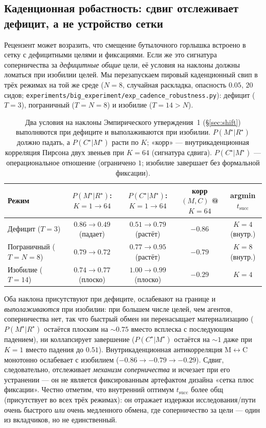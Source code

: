 \documentclass{article}
\newcommand{\method}[1]{\texttt{#1}}
\begin{document}
\subsection{Каденционная робастность: сдвиг отслеживает дефицит, а не устройство сетки}
\label{app:cadence-robustness}

Рецензент может возразить, что смещение бутылочного горлышка встроено в сетку с дефицитными
целями и фиксациями. Если же это сигнатура соперничества за \emph{дефицитные
общие} цели, её условия на наклоны должны ломаться при изобилии целей. Мы
перезапускаем пировый каденционный свип в трёх режимах на той же среде ($N{=}8$, случайная
раскладка, опасность $0.05$, $20$ сидов; \method{experiments/big\_experiment/exp\_cadence\_robustness.py}):
дефицит ($T{=}3$), пограничный ($T{=}N{=}8$) и изобилие ($T{=}14{>}N$).

\begin{table}[h]
\caption{Два условия на наклоны Эмпирического утверждения~1 (\S\ref{sec:shift}) выполняются при дефиците и выполаживаются при изобилии. $P(M^\star|R^\star)$ должно падать, а $P(C^\star|M^\star)$ расти по $K$; «корр» --- внутрикаденционная корреляция Пирсона двух звеньев при $K{=}64$ (сигнатура сдвига). $P(C^\star|M^\star)$ --- операциональное отношение (ограничено $1$; изобилие завершает без формальной фиксации).}
\label{tab:cadence-robustness}
\centering
\small
\begin{tabular}{l c c c c}
\toprule
Режим & $P(M^\star|R^\star)$: $K{=}1\!\to\!64$ & $P(C^\star|M^\star)$: $K{=}1\!\to\!64$ & корр$(M,C)$ @ $K{=}64$ & argmin $t_{\mathrm{succ}}$ \\
\midrule
Дефицит ($T{=}3$)      & $0.86 \to 0.49$ (падает) & $0.51 \to 0.79$ (растёт) & $-0.86$ & $K{=}4$ (внутр.) \\
Пограничный ($T{=}N{=}8$) & $0.79 \to 0.72$        & $0.77 \to 0.95$ (растёт) & $-0.79$ & $K{=}8$ (внутр.) \\
Изобилие ($T{=}14$)    & $0.74 \to 0.77$ (плоско)  & $1.00 \to 0.99$ (плоско)  & $-0.29$ & $K{=}4$ \\
\bottomrule
\end{tabular}
\end{table}

Оба наклона присутствуют при дефиците, ослабевают на границе и \emph{выполаживаются}
при изобилии: при большем числе целей, чем агентов, соперничества нет, так что быстрый
обмен ни перенасыщает материализацию ($P(M^\star|R^\star)$ остаётся плоским
на $\sim0.75$ вместо всплеска с последующим падением), ни коллапсирует завершение
($P(C^\star|M^\star)$ остаётся на $\sim1$ даже при $K{=}1$ вместо падения до
$0.51$). Внутрикаденционная антикорреляция M$\leftrightarrow$C монотонно
ослабевает с изобилием ($-0.86\to-0.79\to-0.29$). Сдвиг, следовательно,
отслеживает \emph{механизм соперничества} и исчезает при его устранении --- он
не является фиксированным артефактом дизайна «сетка плюс фиксации». Честно отметим, что
внутренний оптимум $t_{\mathrm{succ}}$ более общ (присутствует во всех трёх
режимах): он отражает издержки исследования/пути очень быстрого \emph{или} очень
медленного обмена, где соперничество за цели --- один из вкладчиков, но не единственный.
\end{document}
